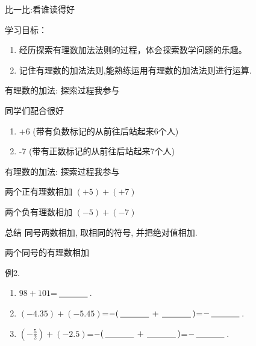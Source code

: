 \documentclass{beamer}
\begin{document}
\kaishu
{}
\begin{frame}{比一比:看谁读得好}
  \kaishu
  \begin{block}{学习目标：}
    \begin{enumerate}
      \item 经历探索有理数加法法则的过程，体会探索数学问题的乐趣。
      \item 记住有理数的加法法则,能熟练运用有理数的加法法则进行运算.
    \end{enumerate}
  \end{block}
\end{frame}


\begin{frame}{有理数的加法: 探索过程我参与}
  \begin{exampleblock}{同学们配合很好}  
    \begin{enumerate}
      \item +6 (带有负数标记的从前往后站起来6个人)  \pause
      \item -7 (带有正数标记的从前往后站起来7个人)
    \end{enumerate}
  \end{exampleblock}
\end{frame}

\def\hspacea{\hspace*{2in}}

\begin{frame}{有理数的加法: 探索过程我参与}  \pause
  \begin{block}{两个正有理数相加}  \pause
    \hspacea $(+5)+(+7)$  \pause
  \end{block}
  \begin{block}{两个负有理数相加}  \pause
    \hspacea $(-5)+(-7)$  \pause
  \end{block}
  \begin{alertblock}{总结}
     同号两数相加, 取相同的符号, 并把绝对值相加. 
  \end{alertblock}
\end{frame}
\begin{frame}{两个同号的有理数相加}
  \begin{exampleblock}{例2.}
    \begin{enumerate}[<+->]
      \item $98+101$=$\,\underline{\mbox{\hspace{1.2cm}}}\,$.
      \item $(-4.35)+(-5.45)$=$-(\,\underline{\mbox{\hspace{1.2cm}}}\,+\,\underline{\mbox{\hspace{1.2cm}}}\,)$=$-\,\underline{\mbox{\hspace{1.2cm}}}\,$.
      \item $(-\frac52)+(-2.5)$=$-(\,\underline{\mbox{\hspace{1.2cm}}}\,+\,\underline{\mbox{\hspace{1.2cm}}}\,)$=$-\,\underline{\mbox{\hspace{1.2cm}}}\,$.
    \end{enumerate}
  \end{exampleblock}
\end{frame}
\end{document}
